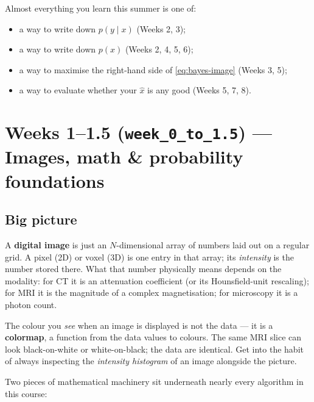 \documentclass[11pt,a4paper]{article}
\begin{document}
Almost everything you learn this summer is one of:

\begin{itemize}[leftmargin=*,nosep]
  \item a way to write down $p(y \mid x)$ (Weeks 2, 3);
  \item a way to write down $p(x)$ (Weeks 2, 4, 5, 6);
  \item a way to maximise the right-hand side of \eqref{eq:bayes-image}
        (Weeks 3, 5);
  \item a way to evaluate whether your $\hat x$ is any good (Weeks 5, 7, 8).
\end{itemize}

\section{Weeks 1--1.5 (\texttt{week\_0\_to\_1.5}) --- Images, math \& probability foundations}

\subsection{Big picture}

A \textbf{digital image} is just an $N$-dimensional array of numbers
laid out on a regular grid. A pixel (2D) or voxel (3D) is one entry
in that array; its \emph{intensity} is the number stored there. What
that number physically means depends on the modality: for CT it is an
attenuation coefficient (or its Hounsfield-unit rescaling); for MRI it
is the magnitude of a complex magnetisation; for microscopy it is a
photon count.

The colour you \emph{see} when an image is displayed is not the data ---
it is a \textbf{colormap}, a function from the data values to colours.
The same MRI slice can look black-on-white or white-on-black; the data
are identical. Get into the habit of always inspecting the
\emph{intensity histogram} of an image alongside the picture.

Two pieces of mathematical machinery sit underneath nearly every
algorithm in this course:
\end{document}

